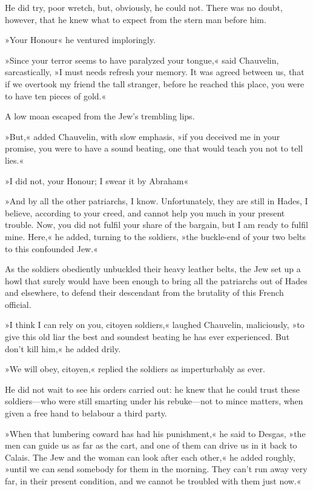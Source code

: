 He did try, poor wretch, but, obviously, he could not. There was no doubt, however, that he knew what to expect from the stern man before him.

»Your Honour\textellipsis« he ventured imploringly.

»Since your terror seems to have paralyzed your tongue,« said Chauvelin, sarcastically, »I must needs refresh your memory. It was agreed between us, that if we overtook my friend the tall stranger, before he reached this place, you were to have ten pieces of gold.«

A low moan escaped from the Jew's trembling lips.

»But,« added Chauvelin, with slow emphasis, »if you deceived me in your promise, you were to have a sound beating, one that would teach you not to tell lies.«

»I did not, your Honour; I swear it by Abraham\textellipsis«

»And by all the other patriarchs, I know. Unfortunately, they are still in Hades, I believe, according to your creed, and cannot help you much in your present trouble. Now, you did not fulfil your share of the bargain, but I am ready to fulfil mine. Here,« he added, turning to the soldiers, »the buckle-end of your two belts to this confounded Jew.«

As the soldiers obediently unbuckled their heavy leather belts, the Jew set up a howl that surely would have been enough to bring all the patriarchs out of Hades and elsewhere, to defend their descendant from the brutality of this French official.

»I think I can rely on you, citoyen soldiers,« laughed Chauvelin, maliciously, »to give this old liar the best and soundest beating he has ever experienced. But don't kill him,« he added drily.

»We will obey, citoyen,« replied the soldiers as imperturbably as ever.

He did not wait to see his orders carried out: he knew that he could trust these soldiers—who were still smarting under his rebuke—not to mince matters, when given a free hand to belabour a third party.

»When that lumbering coward has had his punishment,« he said to Desgas, »the men can guide us as far as the cart, and one of them can drive us in it back to Calais. The Jew and the woman can look after each other,« he added roughly, »until we can send somebody for them in the morning. They can't run away very far, in their present condition, and we cannot be troubled with them just now.«

